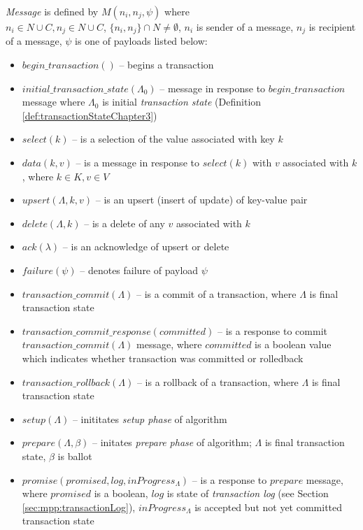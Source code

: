 \begin{definition}
	\label{def:message}
	\emph{Message} is defined by $\mathit{M}(n_{i}, n_{j}, \psi)$ where 
	\\ $n_{i}\in\mathit{N}\cup\mathit{C}, n_{j}\in\mathit{N}\cup\mathit{C}$, $\{n_{i}, n_{j}\}\cap\mathit{N}\neq\emptyset$, $n_{i}$ is sender of a message, $n_{j}$ is recipient of a message, $\psi$ is one of payloads listed below:
	\begin{itemize}	
	\item $\mathit{begin\_transaction}()$ -- begins a transaction 
	\item $\mathit{initial\_transaction\_state}(\Lambda_0)$ -- message in response to $\mathit{begin\_transaction}$ message where $\Lambda_0$ is initial \emph{transaction state} (Definition \ref{def:transactionStateChapter3}) 
	\item $\mathit{select(k)}$ -- is a selection of the value associated with key $k$
	\item $\mathit{data(k,v)}$ -- is a message in response to $\mathit{select(k)}$ with $v$ associated with $k$, where $k\in\mathit{K}, v\in\mathit{V}$ 
	\item $\mathit{upsert}(\Lambda,k,v)$ -- is an upsert (insert of update) of key-value pair 
	\item $\mathit{delete}(\Lambda,k)$ -- is a delete of any $v$ associated with $k$
	\item $\mathit{ack}(\lambda)$ -- is an acknowledge of upsert or delete
	\item $\mathit{failure}(\psi)$ -- denotes failure of payload $\psi$
	\item $\mathit{transaction\_commit}(\Lambda)$ -- is a commit of a transaction, where $\Lambda$ is final transaction state 
	\item $\mathit{transaction\_commit\_response}(committed)$ -- is a response to commit $\mathit{transaction\_commit}(\Lambda)$ message, where $committed$ is a boolean value which indicates whether transaction was committed or rolledback
	\item $\mathit{transaction\_rollback}(\Lambda)$ -- is a rollback of a transaction, where $\Lambda$ is final transaction state 
	\item $\mathit{setup}(\Lambda)$ -- inititates \emph{setup phase} of \mpt algorithm 
	\item $\mathit{prepare}(\Lambda, \beta)$ -- initates \emph{prepare phase} of \mpt algorithm; $\Lambda$ is final transaction state, $\beta$ is \paxos ballot 
	\item $\mathit{promise(promised, log, inProgress_{\Lambda})}$ -- is a response to $\mathit{prepare}$ message, where $\mathit{promised}$ is a boolean, $\mathit{log}$ is state of \emph{transaction log} (see Section \ref{sec:mpp:transactionLog}), $\mathit{inProgress_{\Lambda}}$ is accepted but not yet committed transaction state 

\end{itemize}
\end{definition}
